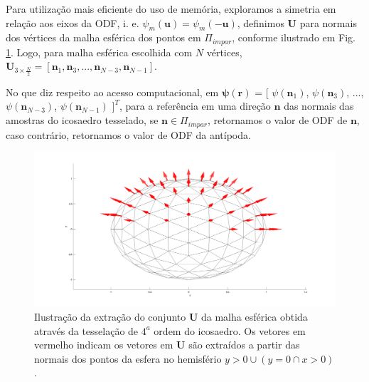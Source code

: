 \documentclass[
    12pt,                %
    oneside,            %
    a4paper,            %
    english,            %
    french,                %
    spanish,            %
    brazil                %
    ]{abntex2}
\begin{document}
Para utilização mais eficiente do uso de memória, exploramos a simetria em relação aos eixos da ODF, i. e. $\psi_m(\mathbf{u}) = \psi_m(-\mathbf{u})$, definimos $\mathbf{U}$ para normais dos vértices da malha esférica dos pontos em $\Pi_{impar}$, conforme ilustrado em Fig. \ref{fig::direcoes}. Logo, para malha esférica escolhida com $N$ vértices, $\mathbf{U}_{3\times \frac{N}{2}} = [
\mathbf{n}_1,
\mathbf{n}_3, ..., 
\mathbf{n}_{N-3},
\mathbf{n}_{N-1}
]$.

No que diz respeito ao acesso computacional, em $\boldsymbol{\psi}(\mathbf{r})$ = [
$\psi(\mathbf{n}_1    )$,
$\psi(\mathbf{n}_3    )$, ..., 
$\psi(\mathbf{n}_{N-3})$,
$\psi(\mathbf{n}_{N-1})$
$]^T$, para a referência em uma direção $\mathbf{n}$ das normais das amostras do icosaedro tesselado, se $\mathbf{n} \in \Pi_{impar}$, retornamos o valor de ODF de $\mathbf{n}$, caso contrário, retornamos o valor de ODF da antípoda.










\begin{figure}[ht]
    \centering
    \includegraphics[width=.8\linewidth, angle=0]{figs/HARDI/icosphere_normals.png}
    \caption{
    Ilustração da extração do conjunto $\mathbf{U}$ da malha esférica obtida através da tesselação de $4^a$ ordem do icosaedro. Os vetores em vermelho indicam os vetores em $\mathbf{U}$ são extraídos a partir das normais dos pontos da esfera no hemisfério $y > 0 \cup (y = 0 \cap x > 0)$.
    }
    \label{fig::direcoes}
   \hspace{1pt}
\end{figure}
\end{document}
